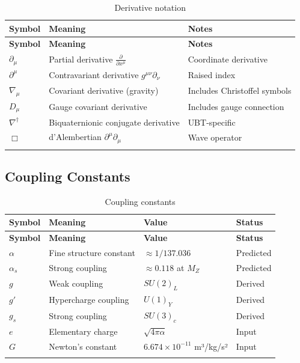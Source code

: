 \begin{longtable}{|l|p{6cm}|p{5cm}|}
\hline
\textbf{Symbol} & \textbf{Meaning} & \textbf{Notes} \\
\hline
\endfirsthead
\hline
\textbf{Symbol} & \textbf{Meaning} & \textbf{Notes} \\
\hline
\endhead

$\partial_\mu$ & Partial derivative $\frac{\partial}{\partial x^\mu}$ & Coordinate derivative \\
\hline
$\partial^\mu$ & Contravariant derivative $g^{\mu\nu}\partial_\nu$ & Raised index \\
\hline
$\nabla_\mu$ & Covariant derivative (gravity) & Includes Christoffel symbols \\
\hline
$D_\mu$ & Gauge covariant derivative & Includes gauge connection \\
\hline
$\nabla^\dagger$ & Biquaternionic conjugate derivative & UBT-specific \\
\hline
$\Box$ & d'Alembertian $\partial^\mu\partial_\mu$ & Wave operator \\
\hline

\caption{Derivative notation}
\label{tab:canonical:derivative_notation}
\end{longtable}

\subsection{Coupling Constants}

\begin{longtable}{|l|p{4cm}|p{3cm}|p{3cm}|}
\hline
\textbf{Symbol} & \textbf{Meaning} & \textbf{Value} & \textbf{Status} \\
\hline
\endfirsthead
\hline
\textbf{Symbol} & \textbf{Meaning} & \textbf{Value} & \textbf{Status} \\
\hline
\endhead

$\alpha$ & Fine structure constant & $\approx 1/137.036$ & Predicted \\
\hline
$\alpha_s$ & Strong coupling & $\approx 0.118$ at $M_Z$ & Predicted \\
\hline
$g$ & Weak coupling & $SU(2)_L$ & Derived \\
\hline
$g'$ & Hypercharge coupling & $U(1)_Y$ & Derived \\
\hline
$g_s$ & Strong coupling & $SU(3)_c$ & Derived \\
\hline
$e$ & Elementary charge & $\sqrt{4\pi\alpha}$ & Input \\
\hline
$G$ & Newton's constant & $6.674 \times 10^{-11}$ m³/kg/s² & Input \\
\hline

\caption{Coupling constants}
\label{tab:canonical:coupling_constants}
\end{longtable}

